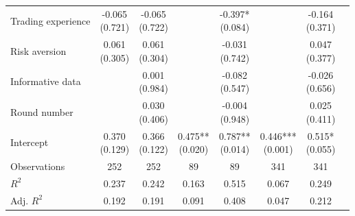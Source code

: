 \begin{threeparttable}
\begin{tabular}{lccccccc}
Trading experience & \makecell{-0.065 \\ (0.721) } & \makecell{-0.065 \\ (0.722) } &  & \makecell{-0.397* \\ (0.084) } &  & \makecell{-0.164 \\ (0.371) } \\
Risk aversion & \makecell{0.061 \\ (0.305) } & \makecell{0.061 \\ (0.304) } &  & \makecell{-0.031 \\ (0.742) } &  & \makecell{0.047 \\ (0.377) } \\
Informative data &  & \makecell{0.001 \\ (0.984) } &  & \makecell{-0.082 \\ (0.547) } &  & \makecell{-0.026 \\ (0.656) } \\
Round number &  & \makecell{0.030 \\ (0.406) } &  & \makecell{-0.004 \\ (0.948) } &  & \makecell{0.025 \\ (0.411) } \\
Intercept & \makecell{0.370 \\ (0.129) } & \makecell{0.366 \\ (0.122) } & \makecell{0.475** \\ (0.020) } & \makecell{0.787** \\ (0.014) } & \makecell{0.446*** \\ (0.001) } & \makecell{0.515* \\ (0.055) } \\
\midrule
\addlinespace
Observations & 252 & 252 & 89 & 89 & 341 & 341 \\
$R^2$ & 0.237 & 0.242 & 0.163 & 0.515 & 0.067 & 0.249 \\
Adj. $R^2$ & 0.192 & 0.191 & 0.091 & 0.408 & 0.047 & 0.212 \\
\bottomrule
\end{tabular}
\footnotesize  
\end{threeparttable}